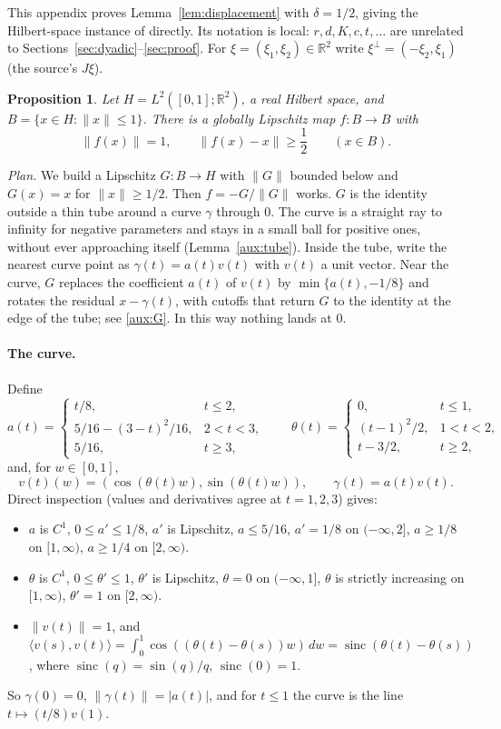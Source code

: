 \documentclass[11pt]{article}
\newcommand{\R}{\mathbb R}
\newcommand{\norm}[1]{\lVert #1\rVert}
\newcommand{\ip}[2]{\langle #1,#2\rangle}
\DeclareMathOperator{\sinc}{sinc}
\newtheorem{proposition}[theorem]{Proposition}
\theoremstyle{definition}
\numberwithin{equation}{section}
\begin{document}
This appendix proves Lemma~\ref{lem:displacement} with $\delta=1/2$,
giving the Hilbert-space instance of \cite{BenyaminiSternfeld1983} directly.
Its notation is local: $r,d,K,c,t,\dots$ are unrelated to
Sections~\ref{sec:dyadic}--\ref{sec:proof}. For $\xi=(\xi_1,\xi_2)\in\R^2$
write $\xi^\perp=(-\xi_2,\xi_1)$ (the source's $J\xi$).

\begin{proposition}\label{aux:map}
Let $H=L^2([0,1];\R^2)$, a real Hilbert space, and
$B=\{x\in H:\norm{x}\le1\}$. There is a globally Lipschitz map $f:B\to B$
with
\[
  \norm{f(x)}=1,\qquad\norm{f(x)-x}\ge\frac12\qquad(x\in B).
\]
\end{proposition}

\emph{Plan.} We build a Lipschitz $G:B\to H$ with $\norm{G}$ bounded below
and $G(x)=x$ for $\norm{x}\ge1/2$. Then $f=-G/\norm{G}$ works. $G$ is the
identity outside a thin tube around a curve $\gamma$ through $0$. The curve
is a straight ray to infinity for negative parameters and stays in a small
ball for positive ones, without ever approaching itself
(Lemma~\ref{aux:tube}). Inside the tube, write the nearest curve point as
$\gamma(t)=a(t)v(t)$ with $v(t)$ a unit vector. Near the curve, $G$ replaces
the coefficient $a(t)$ of $v(t)$ by $\min\{a(t),-1/8\}$ and rotates the
residual $x-\gamma(t)$, with cutoffs that return $G$ to the identity at the
edge of the tube; see \eqref{aux:G}. In this way nothing lands at $0$.

\paragraph{The curve.} Define
\[
 a(t)=
 \begin{cases}
 t/8,&t\le2,\\
 5/16-(3-t)^2/16,&2<t<3,\\
 5/16,&t\ge3,
 \end{cases}
 \qquad
 \theta(t)=
 \begin{cases}
 0,&t\le1,\\
 (t-1)^2/2,&1<t<2,\\
 t-3/2,&t\ge2,
 \end{cases}
\]
and, for $w\in[0,1]$,
\[
 v(t)(w)=(\cos(\theta(t)w),\sin(\theta(t)w)),\qquad\gamma(t)=a(t)v(t).
\]
Direct inspection (values and derivatives agree at $t=1,2,3$) gives:
\begin{itemize}
\item[(F1)] $a$ is $C^1$, $0\le a'\le1/8$, $a'$ is Lipschitz, $a\le5/16$,
 $a'=1/8$ on $(-\infty,2]$, $a\ge1/8$ on $[1,\infty)$, $a\ge1/4$ on
 $[2,\infty)$.
\item[(F2)] $\theta$ is $C^1$, $0\le\theta'\le1$, $\theta'$ is Lipschitz,
 $\theta=0$ on $(-\infty,1]$, $\theta$ is strictly increasing on
 $[1,\infty)$, $\theta'=1$ on $[2,\infty)$.
\item[(F3)] $\norm{v(t)}=1$, and
 $\ip{v(s)}{v(t)}=\int_0^1\cos((\theta(t)-\theta(s))w)\,dw
 =\sinc(\theta(t)-\theta(s))$, where $\sinc(q)=\sin(q)/q$, $\sinc(0)=1$.
\end{itemize}
So $\gamma(0)=0$, $\norm{\gamma(t)}=|a(t)|$, and for $t\le1$ the curve is
the line $t\mapsto(t/8)v(1)$.
\end{document}
